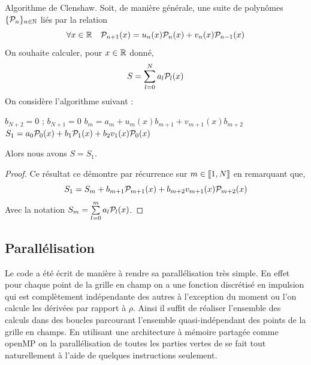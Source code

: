 \documentclass[10pt]{article}
\begin{document}
\begin{multicols}{2}
\begin{proposition}{Algorithme de Clenshaw}.
Soit, de manière générale, une suite de polynômes $\{\mathcal{P}_n\}_{n \in \mathbb{N}}$ liés par la relation
\begin{equation}
  \forall x \in \mathbb{R} \quad \mathcal{P}_{n+1}(x) = u_n(x)\mathcal{P}_n(x) + v_n(x)\mathcal{P}_{n-1}(x)
\end{equation}
On souhaite calculer, pour $x \in \mathbb{R}$ donné, 
\begin{equation}
  S = \sum_{l=0}^{N} a_l \mathcal{P}_l(x)
\end{equation}
On considère l'algorithme suivant :
\vspace*{-11pt}
\begin{algorithm}[H]
  \begin{algorithmic}[1]
    \STATE $b_{N+2} = 0$ ; $b_{N+1} = 0$
    \STATE $b_m = a_m + u_m(x)b_{m+1} + v_{m+1}(x)b_{m+2}$
    \ENDFOR
    \STATE $S_1 = a_0\mathcal{P}_0(x) + b_1\mathcal{P}_1(x) + b_2v_1(x)\mathcal{P}_0(x)$
  \end{algorithmic}
\end{algorithm}
\vspace*{-11pt}
\noindent
Alors nous avons $S = S_1$. 
\end{proposition}

\begin{proof}
Ce résultat ce démontre par récurrence sur $m \in  \llbracket 1,N \rrbracket $ en remarquant que,
\begin{equation}
S_1 = S_m +  b_{m+1}\mathcal{P}_{m+1}(x) + b_{m+2}v_{m+1}(x)\mathcal{P}_{m+2}(x)
\end{equation}
Avec la notation $S_m = \sum\limits_{l=0}^{m} a_l \mathcal{P}_l(x)$.
\end{proof}




\subsection{Parallélisation}


Le code a été écrit de manière à rendre sa parallélisation très simple. En effet pour chaque point de la grille en champ on a une fonction discrétisé en impulsion qui est complètement indépendante des autres à l'exception du moment ou l'on calcule les dérivées par rapport à $\rho$. Ainsi il suffit de réaliser l'ensemble des calculs dans des boucles parcourant l'ensemble quasi-indépendant des points de la grille en champs. En utilisant une architecture à mémoire partagée comme openMP on la parallélisation de toutes les parties vertes de  se fait tout naturellement à l'aide de quelques instructions seulement. 




\end{multicols}
\end{document}

